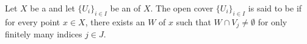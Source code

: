 \begin{definition} \label{definition:locally_finite_open_cover_of_a_topological_spcae}
    Let $X$ be a  and let $\{U_i\}_{i \in I}$ be an  of $X$.
    The open cover $\{U_i\}_{i \in I}$ is said to be  if for every point $x \in X$, there exists an  $W$ of $x$ such that $W \cap V_j \neq \emptyset$ for only finitely many indices $j \in J$.
\end{definition}